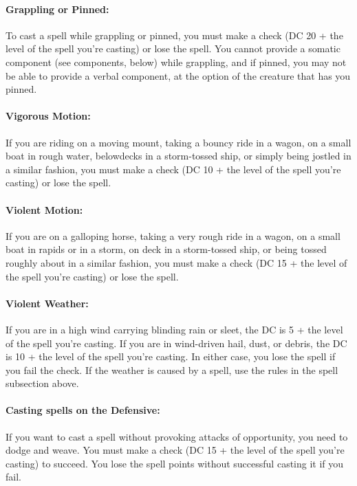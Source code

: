 \paragraph{Grappling or Pinned:} To cast a spell while grappling or pinned, you must make a  check (DC 20 + the level of the spell you're casting) or lose the spell. 
You cannot provide a somatic component (see components, below) while grappling, and if pinned, you may not be able to provide a verbal component, at the option of the creature that has you pinned.

\paragraph{Vigorous Motion:} If you are riding on a moving mount, taking a bouncy ride in a wagon, on a small boat in rough water, belowdecks in a storm-tossed ship, or simply being jostled in a similar fashion, you must make a  check (DC 10 + the level of the spell you're casting) or lose the spell.

\paragraph{Violent Motion:} If you are on a galloping horse, taking a very rough ride in a wagon, on a small boat in rapids or in a storm, on deck in a storm-tossed ship, or being tossed roughly about in a similar fashion, you must make a  check (DC 15 + the level of the spell you're casting) or lose the spell.

\paragraph{Violent Weather:} If you are in a high wind carrying blinding rain or sleet, the DC is 5 + the level of the spell you're casting. If you are in wind-driven hail, dust, or debris, the DC is 10 + the level of the spell you're casting. In either case, you lose the spell if you fail the  check. If the weather is caused by a spell, use the rules in the spell subsection above.

\paragraph{Casting spells on the Defensive:} If you want to cast a spell without provoking attacks of opportunity, you need to dodge and weave. You must make a  check (DC 15 + the level of the spell you're casting) to succeed. You lose the spell points without successful casting it if you fail.

